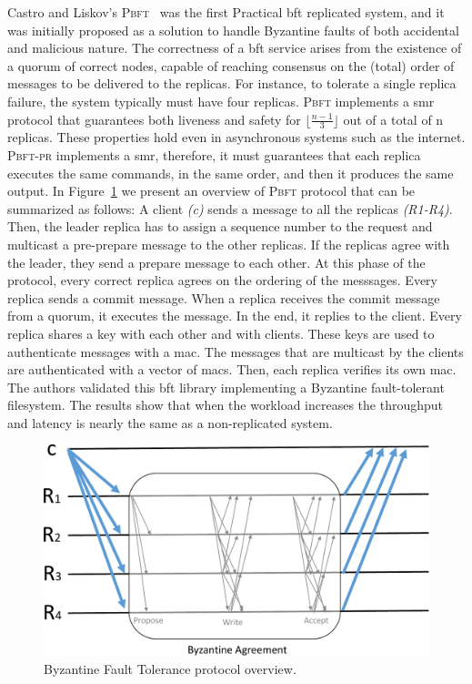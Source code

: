 Castro and Liskov’s \textsc{Pbft}~\cite{Castro:1999} was the first Practical \gls{bft} replicated system, and it was initially proposed as a solution to handle Byzantine faults of both accidental and malicious nature.
The correctness of a \gls{bft} service arises from the existence of a quorum of correct nodes, capable of reaching consensus on the (total) order of messages to be delivered to the replicas.
For instance, to tolerate a single replica failure, the system typically must have four replicas. 
\textsc{Pbft} implements a \gls{smr} protocol that guarantees both liveness and safety for $\lfloor\frac{n-1}{3}\rfloor$ out of a total of n replicas. 
These properties hold even in asynchronous systems such as the internet. 
\textsc{Pbft-pr} implements a \gls{smr}, therefore, it must guarantees that each replica executes the same commands, in the same order, and then it produces the same output. 
In Figure~\ref{fig:bft} we present an overview of \textsc{Pbft} protocol that can be summarized as follows:
A client \emph{(c)} sends a message to all the replicas \emph{(R1-R4)}.
Then, the leader replica has to assign a sequence number to the request and multicast a pre-prepare message to the other replicas. 
If the replicas agree with the leader, they send a prepare message to each other. 
At this phase of the protocol, every correct replica agrees on the ordering of the messsages.  
Every replica sends a commit message. 
When a replica receives the commit message from a quorum, it executes the message. 
In the end, it replies to the client. 
Every replica shares a key with each other and with clients. These keys are used to authenticate messages with a \gls{mac}. 
The messages that are multicast by the clients are authenticated with a vector of \glspl{mac}. 
Then, each replica verifies its own \gls{mac}.
The authors validated this \gls{bft} library implementing a Byzantine fault-tolerant filesystem. 
The results show that when the workload increases the throughput and latency is nearly the same as a non-replicated system. 

\begin{figure}[h]
\begin{center}
\includegraphics[width=.5\columnwidth]{images/images/bft.pdf}
\caption{Byzantine Fault Tolerance protocol overview.}
\label{fig:bft}
\end{center}
\end{figure}

